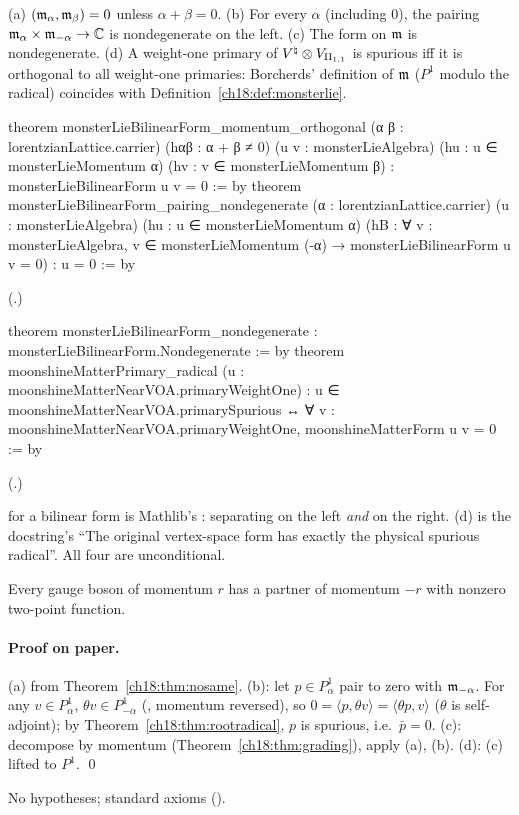 \begin{theorem}\label{ch18:thm:primaryradical}
(a) $(\mathfrak{m}_\alpha,\mathfrak{m}_\beta)=0$ unless $\alpha+\beta=0$.  (b) For every $\alpha$ (including $0$), the pairing
$\mathfrak{m}_\alpha\times\mathfrak{m}_{-\alpha}\to\mathbb C$ is nondegenerate on the left.  (c) The form on $\mathfrak{m}$ is nondegenerate.  (d) A weight-one
primary of ${V^{\natural}}\otimes V_{\mathrm{II}_{1,1}}$ is spurious iff it is orthogonal to all weight-one primaries: Borcherds' definition of
$\mathfrak{m}$ ($P^1$ modulo the radical) coincides with Definition~\ref{ch18:def:monsterlie}.
\end{theorem}
\begin{leancode}
theorem monsterLieBilinearForm_momentum_orthogonal (α β : lorentzianLattice.carrier)
    (hαβ : α + β ≠ 0) (u v : monsterLieAlgebra)
    (hu : u ∈ monsterLieMomentum α) (hv : v ∈ monsterLieMomentum β) :
    monsterLieBilinearForm u v = 0 := by
theorem monsterLieBilinearForm_pairing_nondegenerate (α : lorentzianLattice.carrier)
    (u : monsterLieAlgebra) (hu : u ∈ monsterLieMomentum α)
    (hB : ∀ v : monsterLieAlgebra, v ∈ monsterLieMomentum (-α) →
      monsterLieBilinearForm u v = 0) : u = 0 := by
\end{leancode}
(.)
\begin{leancode}
theorem monsterLieBilinearForm_nondegenerate : monsterLieBilinearForm.Nondegenerate := by
theorem moonshineMatterPrimary_radical (u : moonshineMatterNearVOA.primaryWeightOne) :
    u ∈ moonshineMatterNearVOA.primarySpurious ↔
      ∀ v : moonshineMatterNearVOA.primaryWeightOne, moonshineMatterForm u v = 0 := by
\end{leancode}
(.)
\begin{dictionary}
 for a bilinear form is Mathlib's : separating on the left
\emph{and} on the right.  (d) is the docstring's ``The original vertex-space form has exactly the physical spurious
radical''.  All four are unconditional.
\end{dictionary}
\begin{physics}Every gauge boson of momentum $r$ has a partner of momentum $-r$ with nonzero two-point function.\end{physics}
\paragraph{Proof on paper.}  (a) from Theorem~\ref{ch18:thm:nosame}.  (b): let $p\in P^1_\alpha$ pair to zero with
$\mathfrak{m}_{-\alpha}$.  For any $v\in P^1_\alpha$, $\theta v\in P^1_{-\alpha}$ (, momentum reversed), so
$0=\langle p,\theta v\rangle=\langle\theta p,v\rangle$ ($\theta$ is self-adjoint); by Theorem~\ref{ch18:thm:rootradical}, $p$ is spurious, i.e.\
$\bar p=0$.  (c): decompose by momentum (Theorem~\ref{ch18:thm:grading}), apply (a), (b).  (d): (c) lifted to $P^1$. \qed
\begin{status}No hypotheses; standard axioms (\leanpath{VOA/Moonshine/MoonshineCNAudit11.lean}).\end{status}

